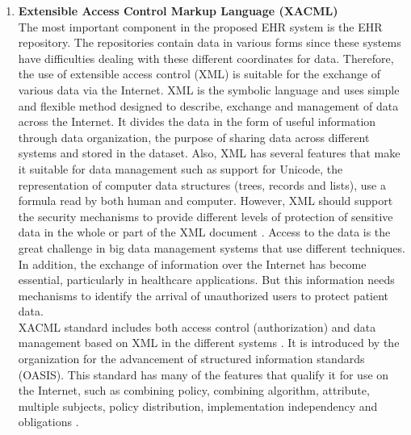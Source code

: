 \documentclass[a4paper,11pt]{article}
\begin{document}
\begin{enumerate}
\item \textbf{Extensible Access Control Markup Language (XACML)}\\
The most important component in the proposed EHR system is the EHR repository. The repositories contain data in various forms since these systems have difficulties dealing with these different coordinates for data. Therefore, the use of extensible access control (XML) is suitable for the exchange of various data via the Internet. XML is the symbolic language and uses simple and flexible method designed to describe, exchange and management of data across the Internet. It divides the data in the form of useful information through data organization, the purpose of sharing data across different systems and stored in the dataset. Also, XML has several features that make it suitable for data management such as support for Unicode, the representation of computer data structures (trees, records and lists), use a formula read by both human and computer. However, XML should support the security mechanisms to provide different levels of protection of sensitive data in the whole or part of the XML document \cite{pr41}. Access to the data is the great challenge in big data management systems that use different techniques. In addition, the exchange of information over the Internet has become essential, particularly in healthcare applications. But this information needs mechanisms to identify the arrival of unauthorized users to protect patient data.\\ XACML standard includes both access control (authorization) and data management based on XML in the different systems \cite{pr42}. It is introduced by the organization for the advancement of structured information standards (OASIS). This standard has many of the features that qualify it for use on the Internet, such as combining policy, combining algorithm, attribute, multiple subjects, policy distribution, implementation independency and obligations \cite{pr43}.
\end{enumerate}
\end{document}
